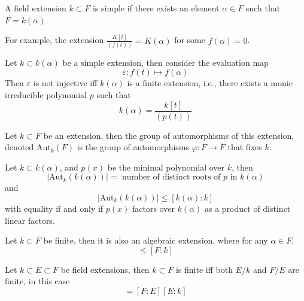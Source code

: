 \documentclass[openany]{book}
\begin{document}
\begin{defn}
    A field extension $k\subset F$ is simple if there exists an element $\alpha\in F$ such that $F=k(\alpha)$.

    For example, the extension $\frac{K[t]}{(f(t))}=K(\alpha)$ for some $f(\alpha)=0$. 
\end{defn}


\begin{prop}
    Let $k\subset k(\alpha)$ be a simple extension, then consider the evaluation map 
    \begin{equation*}
        \varepsilon: f(t)\mapsto f(\alpha)
    \end{equation*}
    Then $\varepsilon$ is not injective iff $k(\alpha)$ is a finite extension, i.e., there exists a monic irreducible polynomial $p$ such that 
    \begin{equation*}
        k(\alpha)=\frac{k[t]}{(p(t))}
    \end{equation*}
\end{prop}

\begin{defn}
    Let $k\subset F$ be an extension, then the group of automorphisms of this extension, denoted $\text{Aut}_k(F)$ is the group of automorphisms $\varphi:F\to F$ that fixes $k$.
\end{defn}

\begin{cor}
    Let $k\subset k(\alpha)$, and $p(x)$ be the minimal polynomial over $k$, then 
    \begin{equation*}
        |\text{Aut}_k(k(\alpha))|=\text{ number of distinct roots of $p$ in $k(\alpha)$}
    \end{equation*}
    and 
    \begin{equation*}
        |\text{Aut}_k(k(\alpha))|\leq [k(\alpha):k]
    \end{equation*}
    with equality if and only if $p(x)$ factors over $k(\alpha)$ as a product of distinct linear factors.
\end{cor}


\begin{prop}
    Let $k\subset F$ be finite, then it is also an algebraic extension, where for any $\alpha\in F$, 
    \begin{equation*}
        [k(\alpha):k]\leq [F: k]
    \end{equation*}
\end{prop}



\begin{prop}
    Let $k\subset E\subset F$ be field extensions, then $k\subset F$ is finite iff both $E/k$ and $F/E$ are finite, in this case 
    \begin{equation*}
        [F:k]=[F:E][E:k]
    \end{equation*}
\end{prop}
\end{document}
